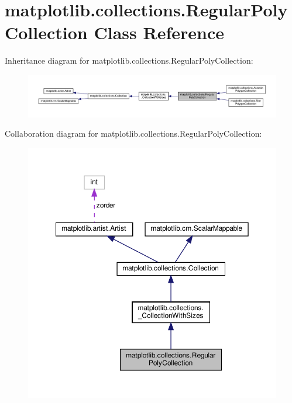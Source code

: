 \hypertarget{classmatplotlib_1_1collections_1_1RegularPolyCollection}{}\section{matplotlib.\+collections.\+Regular\+Poly\+Collection Class Reference}
\label{classmatplotlib_1_1collections_1_1RegularPolyCollection}


Inheritance diagram for matplotlib.\+collections.\+Regular\+Poly\+Collection\+:
\nopagebreak
\begin{figure}[H]
\begin{center}
\leavevmode
\includegraphics[width=350pt]{classmatplotlib_1_1collections_1_1RegularPolyCollection__inherit__graph}
\end{center}
\end{figure}


Collaboration diagram for matplotlib.\+collections.\+Regular\+Poly\+Collection\+:
\nopagebreak
\begin{figure}[H]
\begin{center}
\leavevmode
\includegraphics[width=350pt]{classmatplotlib_1_1collections_1_1RegularPolyCollection__coll__graph}
\end{center}
\end{figure}

